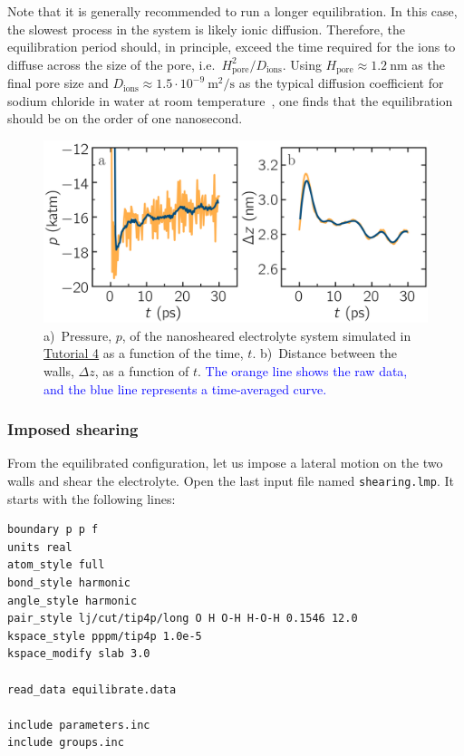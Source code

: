 \documentclass[9pt,tutorial]{livecoms}
\newcommand{\flecmd}[1]{\textcolor{command}{\texttt{#1}}} %
\begin{document}
\begin{note}
Note that it is generally recommended to run a longer equilibration.  In this case,
the slowest process in the system is likely ionic diffusion.
Therefore, the equilibration period should, in principle, exceed the time required
for the ions to diffuse across the size of the pore, i.e.~$H_\text{pore}^2/D_\text{ions}$.
Using $H_\text{pore} \approx 1.2~\text{nm}$ as the final pore size
and $D_\text{ions} \approx 1.5 \cdot 10^{-9}~\text{m}^2/\text{s}$
as the typical diffusion coefficient for sodium chloride in water at room
temperature~\cite{mills1955remeasurement}, one finds that the equilibration
should be on the order of one nanosecond.
\end{note}

\begin{figure}
\centering
\includegraphics[width=\linewidth]{NANOSHEAR-equilibration}
\caption{a)~Pressure, $p$, of the nanosheared electrolyte system
simulated in \hyperref[sheared-confined-label]{Tutorial 4} as a function of the
time, $t$.  b)~Distance between the walls, $\Delta z$, as a function of $t$.
\textcolor{blue}{The orange line
shows the raw data, and the blue line represents a time-averaged curve.}}
\label{fig:NANOSHEAR-equilibration}
\end{figure}

\subsubsection{Imposed shearing}

From the equilibrated configuration, let us impose a lateral motion on the two
walls and shear the electrolyte.  Open the last input file named \flecmd{shearing.lmp}.
It starts with the following lines:
\begin{lstlisting}
boundary p p f
units real
atom_style full
bond_style harmonic
angle_style harmonic
pair_style lj/cut/tip4p/long O H O-H H-O-H 0.1546 12.0
kspace_style pppm/tip4p 1.0e-5
kspace_modify slab 3.0

read_data equilibrate.data

include parameters.inc
include groups.inc
\end{lstlisting}
\end{document}
